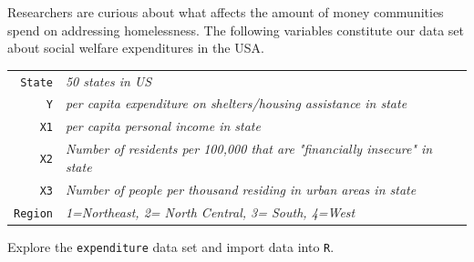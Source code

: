 \documentclass[12pt,letterpaper]{article}
\begin{document}
	\noindent Researchers are curious about what affects the amount of money communities spend on addressing homelessness. The following variables constitute our data set about social welfare expenditures in the USA. \\
	\vspace{.5cm}
	
	
	\begin{tabular}{r|l}
		\texttt{State} &\emph{50 states in US} \\
		\texttt{Y} & \emph{per capita expenditure on shelters/housing assistance in state}\\
		\texttt{X1} &\emph{per capita personal income in state} \\
		\texttt{X2} &  \emph{Number of residents per 100,000 that are "financially insecure" in state}\\
		\texttt{X3} &  \emph{Number of people per thousand residing in urban areas in state} \\
		\texttt{Region} &  \emph{1=Northeast, 2= North Central, 3= South, 4=West} \\
	\end{tabular}
	
	\vspace{.5cm}
	\noindent Explore the \texttt{expenditure} data set and import data into \texttt{R}.
	\vspace{.5cm}
\end{document}
